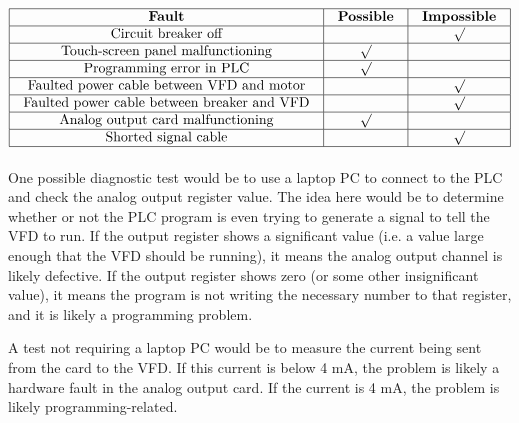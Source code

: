 $$\vbox{\offinterlineskip
\halign{\strut
\vrule \quad\hfil # \ \hfil & 
\vrule \quad\hfil # \ \hfil & 
\vrule \quad\hfil # \ \hfil \vrule \cr
\noalign{\hrule}
%
{\bf Fault} & {\bf Possible} & {\bf Impossible} \cr
%
\noalign{\hrule}
%
Circuit breaker off &  & $\surd$ \cr
%
\noalign{\hrule}
%
Touch-screen panel malfunctioning & $\surd$  & \cr
%
\noalign{\hrule}
%
Programming error in PLC & $\surd$  & \cr
%
\noalign{\hrule}
%
Faulted power cable between VFD and motor &  & $\surd$ \cr
%
\noalign{\hrule}
%
Faulted power cable between breaker and VFD &  & $\surd$ \cr
%
\noalign{\hrule}
%
Analog output card malfunctioning & $\surd$  & \cr
%
\noalign{\hrule}
%
Shorted signal cable &  & $\surd$ \cr
%
\noalign{\hrule}
} %
}$$ %

One possible diagnostic test would be to use a laptop PC to connect to the PLC and check the analog output register value.  The idea here would be to determine whether or not the PLC program is even trying to generate a signal to tell the VFD to run.  If the output register shows a significant value (i.e. a value large enough that the VFD should be running), it means the analog output channel is likely defective.  If the output register shows zero (or some other insignificant value), it means the program is not writing the necessary number to that register, and it is likely a programming problem.

A test not requiring a laptop PC would be to measure the current being sent from the card to the VFD.  If this current is below 4 mA, the problem is likely a hardware fault in the analog output card.  If the current is 4 mA, the problem is likely programming-related.




